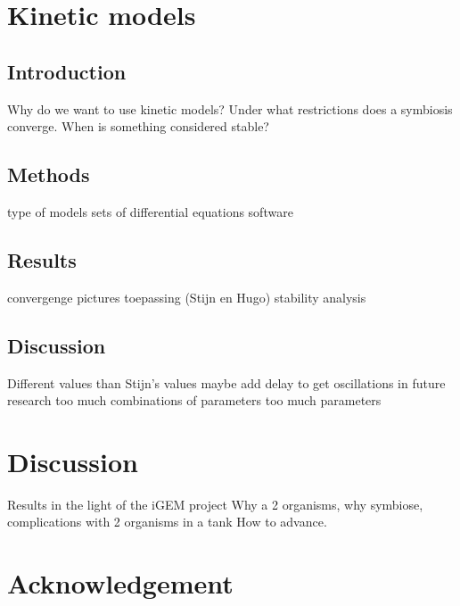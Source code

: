 \documentclass[10pt]{report}
\begin{document}
\chapter{Kinetic models}

\begin{abstract}
  
\end{abstract}

\section{Introduction}
Why do we want to use kinetic models?
Under what restrictions does a symbiosis converge.
When is something considered stable?

\section{Methods}
type of models
sets of differential equations
software

\section{Results}
convergenge
pictures
toepassing (Stijn en Hugo)
stability analysis

\section{Discussion}
Different values than Stijn's values
maybe add delay to get oscillations in future research
too much combinations of parameters
too much parameters

\chapter{Discussion}
Results in the light of the iGEM project
Why a 2 organisms, why symbiose, complications with 2 organisms in a tank
How to advance.


\chapter{Acknowledgement}
\end{document}
